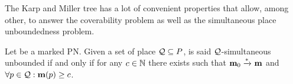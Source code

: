 %
%
%
%
%
%
%
%
%

The Karp and Miller tree has a lot of convenient properties that allow, among other, to answer the coverability problem as well as the simultaneous place unboundedness problem.

\begin{defi}
  Let \NPTm be a marked \ac{PN}.
  Given a set of place $\mathcal{Q} \subseteq P$, \namePN is said $\mathcal{Q}$-simultaneous unbounded if and only if for any $c \in \mathbb{N}$ there exists \mar such that $\mathbf{m}_0 \xrightarrow{*}_{} \mathbf{m}$ and $\forall p \in \mathcal{Q} : \mathbf{m}(p) \geq c$.
\end{defi}

